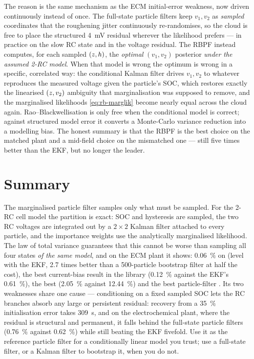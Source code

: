 The reason is the same mechanism as the ECM initial-error weakness, now driven continuously instead
of once.  The full-state particle filters keep $v_1,v_2$ as \emph{sampled} coordinates that the
roughening jitter continuously re-randomises, so the cloud is free to place the structured
\SI{4}{\milli\volt} residual wherever the likelihood prefers --- in practice on the slow RC state
and in the voltage residual.  The RBPF instead computes, for each sampled $(z,h)$, the
\emph{optimal} $(v_1,v_2)$ posterior \emph{under the assumed 2-RC model}.  When that model is wrong
the optimum is wrong in a specific, correlated way: the conditional Kalman filter drives $v_1,v_2$
to whatever reproduces the measured voltage given the particle's SOC, which restores exactly the
linearised $(z, v_2)$ ambiguity that marginalisation was supposed to remove, and the marginalised
likelihoods \eqref{eq:rb-marglik} become nearly equal across the cloud again.  Rao--Blackwellisation
is only free when the conditional model is correct; against structured model error it converts a
Monte-Carlo variance reduction into a modelling bias.  The honest summary is that the RBPF is the
best choice on the matched plant and a mid-field choice on the mismatched one --- still five times
better than the EKF, but no longer the leader.

\section{Summary}
The marginalised particle filter samples only what must be sampled.  For the 2-RC cell model the
partition is exact: SOC and hysteresis are sampled, the two RC voltages are integrated out by a
$2\times2$ Kalman filter attached to every particle, and the importance weights use the analytically
marginalised likelihood.  The law of total variance guarantees that this cannot be worse than
sampling all four states \emph{of the same model}, and on the ECM plant it shows: \SI{0.06}{\percent}
on  (level with the EKF, \num{2.7} times better than a 500-particle bootstrap filter
at half the cost), the best current-bias result in the library (\SI{0.12}{\percent} against the
EKF's \SI{0.61}{\percent}), the best  (\SI{2.05}{\percent} against \SI{12.44}{\percent})
and the best particle-filter .  Its two weaknesses share one cause --- conditioning on
a fixed sampled SOC lets the RC branches absorb any large or persistent residual: recovery from a
\SI{35}{\percent} initialisation error takes \SI{309}{\second}, and on the electrochemical plant,
where the residual is structural and permanent, it falls behind the full-state particle filters
(\SI{0.76}{\percent} against \SI{0.62}{\percent}) while still beating the EKF fivefold.  Use it as
the reference particle filter for a conditionally linear model you trust; use a full-state filter,
or a Kalman filter to bootstrap it, when you do not.
